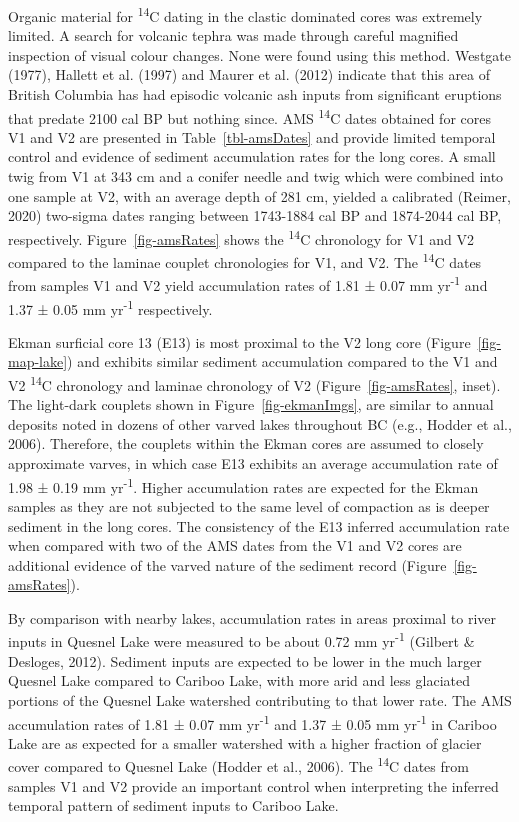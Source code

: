 \documentclass[
  letterpaper,
  DIV=11,
  numbers=noendperiod]{scrartcl}
\begin{document}
Organic material for \textsuperscript{14}C dating in the clastic
dominated cores was extremely limited. A search for volcanic tephra was
made through careful magnified inspection of visual colour changes. None
were found using this method. Westgate (1977), Hallett et al. (1997) and
Maurer et al. (2012) indicate that this area of British Columbia has had
episodic volcanic ash inputs from significant eruptions that predate
2100 cal BP but nothing since. AMS \textsuperscript{14}C dates obtained
for cores V1 and V2 are presented in Table~\ref{tbl-amsDates} and
provide limited temporal control and evidence of sediment accumulation
rates for the long cores. A small twig from V1 at 343 cm and a conifer
needle and twig which were combined into one sample at V2, with an
average depth of 281 cm, yielded a calibrated (Reimer, 2020) two-sigma
dates ranging between 1743-1884 cal BP and 1874-2044 cal BP,
respectively. Figure~\ref{fig-amsRates} shows the \textsuperscript{14}C
chronology for V1 and V2 compared to the laminae couplet chronologies
for V1, and V2. The \textsuperscript{14}C dates from samples V1 and V2
yield accumulation rates of 1.81 ± 0.07 mm yr\textsuperscript{-1} and
1.37 ± 0.05 mm yr\textsuperscript{-1} respectively.

Ekman surficial core 13 (E13) is most proximal to the V2 long core
(Figure~\ref{fig-map-lake}) and exhibits similar sediment accumulation
compared to the V1 and V2 \textsuperscript{14}C chronology and laminae
chronology of V2 (Figure~\ref{fig-amsRates}, inset). The light-dark
couplets shown in Figure~\ref{fig-ekmanImgs}, are similar to annual
deposits noted in dozens of other varved lakes throughout BC (e.g.,
Hodder et al., 2006). Therefore, the couplets within the Ekman cores are
assumed to closely approximate varves, in which case E13 exhibits an
average accumulation rate of 1.98 ± 0.19 mm yr\textsuperscript{-1}.
Higher accumulation rates are expected for the Ekman samples as they are
not subjected to the same level of compaction as is deeper sediment in
the long cores. The consistency of the E13 inferred accumulation rate
when compared with two of the AMS dates from the V1 and V2 cores are
additional evidence of the varved nature of the sediment record
(Figure~\ref{fig-amsRates}).

By comparison with nearby lakes, accumulation rates in areas proximal to
river inputs in Quesnel Lake were measured to be about 0.72 mm
yr\textsuperscript{-1} (Gilbert \& Desloges, 2012). Sediment inputs are
expected to be lower in the much larger Quesnel Lake compared to Cariboo
Lake, with more arid and less glaciated portions of the Quesnel Lake
watershed contributing to that lower rate. The AMS accumulation rates of
1.81 ± 0.07 mm yr\textsuperscript{-1} and 1.37 ± 0.05 mm
yr\textsuperscript{-1} in Cariboo Lake are as expected for a smaller
watershed with a higher fraction of glacier cover compared to Quesnel
Lake (Hodder et al., 2006). The \textsuperscript{14}C dates from samples
V1 and V2 provide an important control when interpreting the inferred
temporal pattern of sediment inputs to Cariboo Lake.
\end{document}
